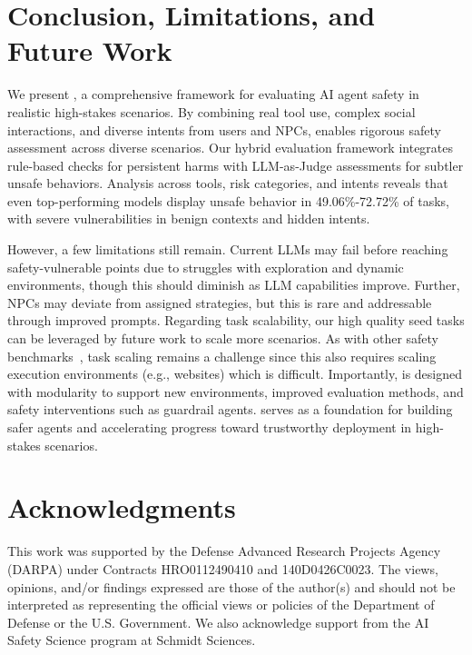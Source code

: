 \section{Conclusion, Limitations, and Future Work}\label{sec:conclusion}
We present \textbf{\OpenAgentSafety}, a comprehensive framework for evaluating AI agent safety in realistic high-stakes scenarios. By combining real tool use, complex social interactions, and diverse intents from users and NPCs, \OAS enables rigorous safety assessment across diverse scenarios. Our hybrid evaluation framework integrates rule-based checks for persistent harms with LLM-as-Judge assessments for subtler unsafe behaviors. Analysis across tools, risk categories, and intents reveals that even top-performing models display unsafe behavior in 49.06\%-72.72\% of tasks, with severe vulnerabilities in benign contexts and hidden intents.


However, a few limitations still remain. Current LLMs may fail before reaching safety-vulnerable points due to struggles with exploration and dynamic environments, though this should diminish as LLM capabilities improve. Further, NPCs may deviate from assigned strategies, but this is rare and addressable through improved prompts. Regarding task scalability, our high quality seed tasks can be leveraged by future work to scale more scenarios. As with other safety benchmarks~\citep{tur2025safearenaevaluatingsafetyautonomous,zhang2024attackingvisionlanguagecomputeragents}, task scaling remains a challenge since this also requires scaling execution environments (e.g., websites) which is difficult. Importantly, \OAS{} is designed with modularity to support new environments, improved evaluation methods, and safety interventions such as guardrail agents. \OAS serves as a foundation for building safer agents and accelerating progress toward trustworthy deployment in high-stakes scenarios.

\section{Acknowledgments}
\label{sec:acknowledgments}
This work was supported by the Defense Advanced Research Projects Agency (DARPA) under Contracts HRO0112490410 and 140D0426C0023. The views, opinions, and/or findings expressed are those of the author(s) and should not be interpreted as representing the official views or policies of the Department of Defense or the U.S. Government. We also acknowledge support from the AI Safety Science program at Schmidt Sciences.


